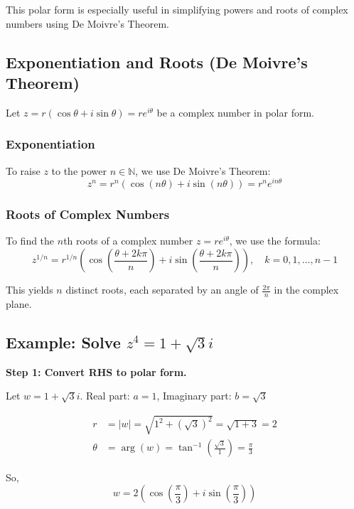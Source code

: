 This polar form is especially useful in simplifying powers and roots of complex numbers using De Moivre’s Theorem.

\subsection{Exponentiation and Roots (De Moivre's Theorem)}

Let \( z = r(\cos \theta + i \sin \theta) = re^{i\theta} \) be a complex number in polar form.

\subsubsection{Exponentiation}

To raise \( z \) to the power \( n \in \mathbb{N} \), we use De Moivre’s Theorem:
\[
z^n = r^n (\cos(n\theta) + i \sin(n\theta)) = r^n e^{in\theta}
\]

\subsubsection{Roots of Complex Numbers}

To find the \( n \)th roots of a complex number \( z = r e^{i\theta} \), we use the formula:
\[
z^{1/n} = r^{1/n} \left( \cos\left( \frac{\theta + 2k\pi}{n} \right) + i \sin\left( \frac{\theta + 2k\pi}{n} \right) \right), \quad k = 0, 1, \ldots, n-1
\]

This yields \( n \) distinct roots, each separated by an angle of \( \frac{2\pi}{n} \) in the complex plane.

\subsection{Example: Solve \( z^4 = 1 + \sqrt{3}i \)}

\textbf{Step 1: Convert RHS to polar form.}

Let \( w = 1 + \sqrt{3}i \).  
Real part: \( a = 1 \), Imaginary part: \( b = \sqrt{3} \)

\begin{align*}
r &= |w| = \sqrt{1^2 + (\sqrt{3})^2} = \sqrt{1 + 3} = 2 \\
\theta &= \arg(w) = \tan^{-1} \left( \frac{\sqrt{3}}{1} \right) = \frac{\pi}{3}
\end{align*}

So,
\[
w = 2 \left( \cos\left( \frac{\pi}{3} \right) + i \sin\left( \frac{\pi}{3} \right) \right)
\]

